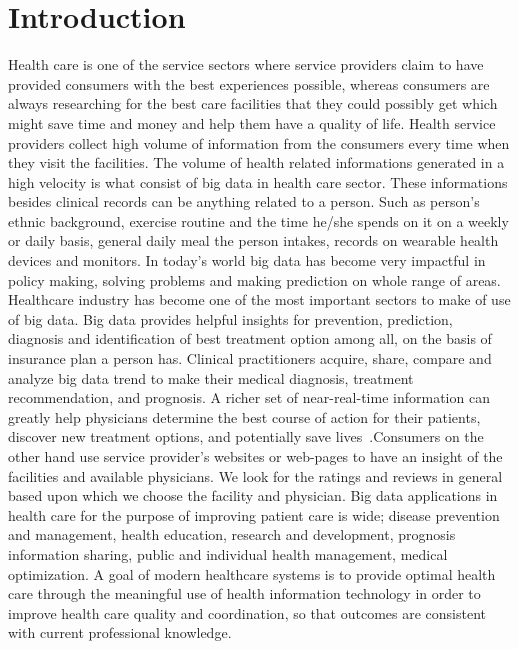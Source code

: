 \documentclass[sigconf]{acmart}
\begin{document}
\section{Introduction}
Health care is one of the service sectors where service providers claim to have provided consumers with the best experiences 
possible, whereas consumers are always researching for the best care facilities that they could possibly get which might save 
time and money and help them have a quality of life. Health service providers collect high volume of information from the 
consumers every time when they visit the facilities. The volume of health related informations generated in a high velocity 
is what consist of big data in health care sector.
These informations besides clinical records can be anything related to a person. Such as  person's ethnic background, exercise routine
and the time he/she spends on it on a weekly or daily basis, general daily meal the person intakes, records on wearable health devices 
and monitors. In today's world big data has become very impactful in policy making, solving problems and making prediction on 
whole range 
of areas. Healthcare industry has become one of the most important sectors to make of use of big data. Big data provides 
helpful insights 
for prevention, prediction, diagnosis and identification of best treatment option among all, on the basis of insurance plan a person 
has. Clinical practitioners acquire, share, compare and analyze big data trend to make their medical diagnosis, treatment
recommendation, and prognosis. A richer set of near-real-time information can greatly help
physicians determine the best course of action for their patients, discover new treatment
options, and potentially save lives~\cite{www-hpe}.Consumers on the other hand use service provider's websites or web-pages 
to have an insight of the facilities and available physicians.
We look for the ratings and reviews in general based upon which we choose the facility and physician. Big data applications in 
health care for the purpose of
improving patient care is wide; disease prevention and management, health education, research and development, prognosis  
information sharing, public and individual health management, medical optimization. A goal of modern healthcare systems is to
provide optimal health care through the meaningful use of health information technology in order to improve health care quality 
and coordination, so that outcomes are consistent with current professional knowledge\cite{www-mapr-com}.
\end{document}
